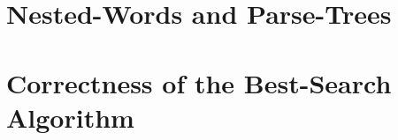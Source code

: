 \section{Nested-Words and Parse-Trees} \label{sec:trees}



\section{Correctness of the Best-Search Algorithm} \label{sec:bestsearch}



\newpage
\listoftodos



